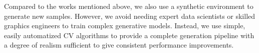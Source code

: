 Compared to the works mentioned above, we also use a synthetic environment to generate new samples. However, we avoid needing expert data scientists or skilled graphics engineers to train complex generative models. Instead, we use simple, easily automatized CV algorithms to provide a complete generation pipeline with a degree of realism sufficient to give consistent performance improvements.




